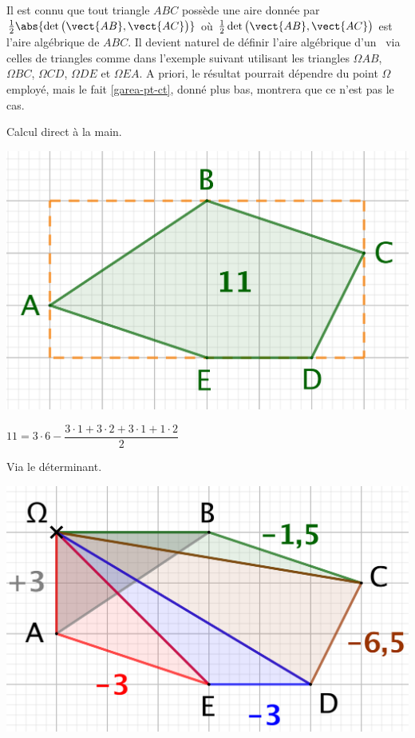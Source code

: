 Il est connu que tout triangle $ABC$ possède une aire donnée par $\frac12 \abs{ \det \big( \vect{AB} , \vect{AC} \big) }$ où $\frac12 \det \big( \vect{AB} , \vect{AC} \big)$ est l'aire algébrique de $ABC$.
Il devient naturel de définir l'aire algébrique d'un \ngone\ via celles de triangles comme dans l'exemple suivant utilisant les triangles $\Omega AB$, $\Omega BC$, $\Omega CD$, $\Omega DE$ et $\Omega EA$. A priori, le résultat pourrait dépendre du point $\Omega$ employé, mais le fait \ref{garea-pt-ct}, donné plus bas, montrera que ce n'est pas le cas.

\begin{multicols}{2}
	\small\itshape
    \begin{center}
		Calcul direct à la main.

		\smallskip

        \includegraphics[scale=.35]{content/polygon/at-least-one/convex-1.png}

       	\smallskip

		$11 = 3 \cdot 6 - \dfrac{3 \cdot 1 + 3 \cdot 2 + 3 \cdot 1 + 1 \cdot 2}{2}$
    \end{center}

	\columnbreak

    \begin{center}
		Via le déterminant.

		\smallskip

        \includegraphics[scale=.35]{content/polygon/at-least-one/convex-2.png}


\end{center}
\end{multicols}
